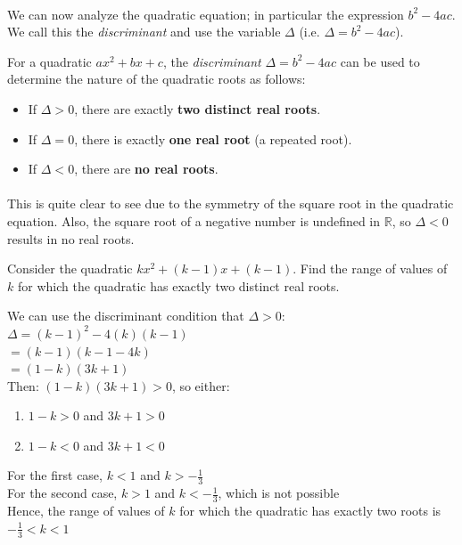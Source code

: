 \documentclass[12pt, a4paper, titlepage, twoside]{article}
\newcommand*{\R}{\mathbb{R}}
\newcounter{excount}[subsection]
\begin{document}
	\paragraph{}
	We can now analyze the quadratic equation; in particular the expression $b^2 - 4ac$. We call this the \textit{discriminant}
	and use the variable $\Delta$ (i.e. $\Delta = b^2 - 4ac$).\\
	
	\begin{kp}
		For a quadratic $ax^2 + bx + c$, the \textit{discriminant} $\Delta = b^2 - 4ac$ can be used to determine the nature of the quadratic
		roots as follows:
		
		\begin{itemize}
			\item If $\Delta > 0$, there are exactly \textbf{two distinct real roots}.
			\item If $\Delta = 0$, there is exactly \textbf{one real root} (a repeated root).
			\item If $\Delta < 0$, there are \textbf{no real roots}.
		\end{itemize}
	\end{kp}
	
	\paragraph{}
	This is quite clear to see due to the symmetry of the square root in the quadratic equation. Also, the square root of a
	negative number is undefined in $\R$, so $\Delta < 0$ results in no real roots.\\
	
	\begin{ex}
		Consider the quadratic $kx^2 + (k-1)x + (k-1)$. Find the range of values of $k$ for which the quadratic has exactly two 
		distinct real roots.
		
		\hfill
		\tcbline
		\hfill
		
		We can use the discriminant condition that $\Delta > 0$:\\ 
		$\Delta = (k-1)^2 - 4(k)(k-1)$\\
		$= (k-1)(k-1-4k)$\\
		$= (1-k)(3k+1)$\\
		
		Then: $(1-k)(3k+1) > 0$, so either:
		\begin{enumerate}
			\item $1-k > 0$ and $3k+1 > 0$
			\item $1-k < 0$ and $3k+1 < 0$
		\end{enumerate}
		\hfill
		
		For the first case, $k < 1$ and $k > -\frac{1}{3}$\\
		
		For the second case, $k > 1$ and $k < -\frac{1}{3}$, which is not possible\\
		
		Hence, the range of values of $k$ for which the quadratic has exactly two roots is $-\frac{1}{3} < k < 1$
	\end{ex}
	
\end{document}
